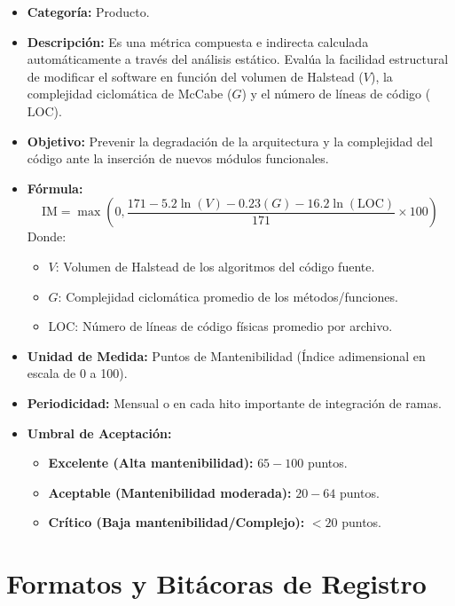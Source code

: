 \documentclass[12pt]{article}
\begin{document}
\begin{itemize}
    \item \textbf{Categoría:} Producto.
    \item \textbf{Descripción:} Es una métrica compuesta e indirecta calculada automáticamente a través del análisis estático. Evalúa la facilidad estructural de modificar el software en función del volumen de Halstead ($V$), la complejidad ciclomática de McCabe ($G$) y el número de líneas de código ($\text{LOC}$).
    \item \textbf{Objetivo:} Prevenir la degradación de la arquitectura y la complejidad del código ante la inserción de nuevos módulos funcionales.
    \item \textbf{Fórmula:}
    \begin{equation}
        \text{IM} = \max\left(0, \frac{171 - 5.2 \ln(V) - 0.23(G) - 16.2 \ln(\text{LOC})}{171} \times 100\right)
    \end{equation}
    Donde:
    \begin{itemize}
        \item $V$: Volumen de Halstead de los algoritmos del código fuente.
        \item $G$: Complejidad ciclomática promedio de los métodos/funciones.
        \item $\text{LOC}$: Número de líneas de código físicas promedio por archivo.
    \end{itemize}
    \item \textbf{Unidad de Medida:} Puntos de Mantenibilidad (Índice adimensional en escala de 0 a 100).
    \item \textbf{Periodicidad:} Mensual o en cada hito importante de integración de ramas.
    \item \textbf{Umbral de Aceptación:} 
    \begin{itemize}
        \item \textcolor{process}{\textbf{Excelente (Alta mantenibilidad):}} $65 - 100$ puntos.
        \item \textcolor{value}{\textbf{Aceptable (Mantenibilidad moderada):}} $20 - 64$ puntos.
        \item \textcolor{accentred}{\textbf{Crítico (Baja mantenibilidad/Complejo):}} $< 20$ puntos.
    \end{itemize}
\end{itemize}

\newpage

\section{Formatos y Bitácoras de Registro}
\end{document}
